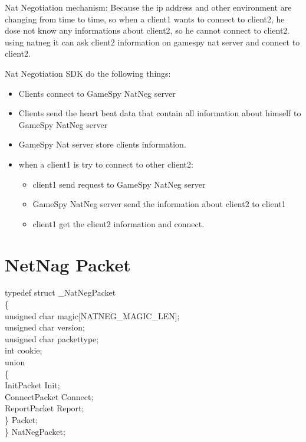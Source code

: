 \documentclass[oneside,titlepage,a4paper]{Definition/retrospy} %
\begin{document}
Nat Negotiation mechanism:
Because the ip address and other environment are changing from time to time, so when a client1 wants to connect
to client2, he dose not know any informations about client2, so he cannot connect to client2. using natneg it can ask client2 information on gamespy nat server and connect to client2.

Nat Negotiation SDK do the following things:
\begin{itemize}
	\item Clients connect to GameSpy NatNeg server
	\item Clients send the heart beat data that contain all information about himself to GameSpy NatNeg server
	\item GameSpy Nat server store clients information.
	\item when a client1 is try to connect to other client2:
	\begin{itemize}
		\item client1 send request to GameSpy NatNeg server
	\item GameSpy NatNeg server send the information about client2 to client1
		\item  client1 get the client2 information and connect.
	\end{itemize}
	

\end{itemize}




\section{NetNag Packet}

\begin{mybox}
	typedef struct \_NatNegPacket \\
	\{\\
	unsigned char magic[NATNEG\_MAGIC\_LEN];\\
	unsigned char version;\\
	unsigned char packettype;\\
	int cookie;	\\
	
	union\\
	\{\\
	InitPacket Init;\\
	ConnectPacket Connect;\\
	ReportPacket Report;\\
	\} Packet;\\
	
	\} NatNegPacket;
\end{mybox}
\end{document}
